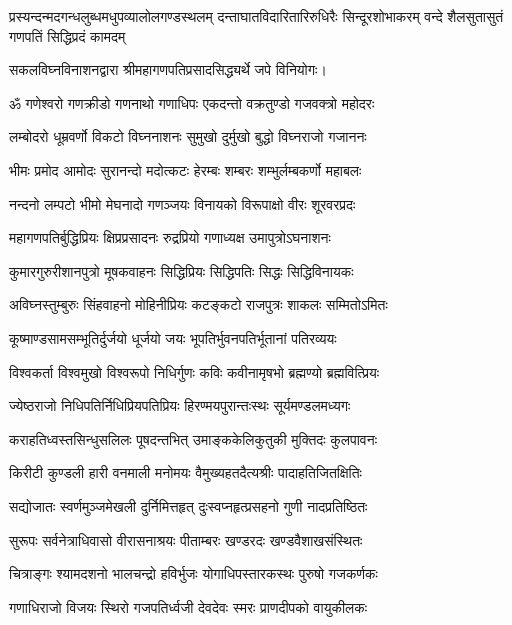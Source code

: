 {प्रस्यन्दन्मदगन्धलुब्धमधुपव्यालोलगण्डस्थलम्}
{दन्ताघातविदारितारिरुधिरैः सिन्दूरशोभाकरम्}
{वन्दे शैलसुतासुतं गणपतिं सिद्धिप्रदं कामदम्}

सकलविघ्नविनाशनद्वारा श्रीमहागणपतिप्रसादसिद्ध्यर्थे जपे विनियोगः।



\resetShloka
\twolineshloka
{ॐ गणेश्वरो गणक्रीडो गणनाथो गणाधिपः}
{एकदन्तो वक्रतुण्डो गजवक्त्रो महोदरः}

\twolineshloka
{लम्बोदरो धूम्रवर्णो विकटो विघ्ननाशनः}
{सुमुखो दुर्मुखो बुद्धो विघ्नराजो गजाननः}

\twolineshloka
{भीमः प्रमोद आमोदः सुरानन्दो मदोत्कटः}
{हेरम्बः शम्बरः शम्भुर्लम्बकर्णो महाबलः}

\twolineshloka
{नन्दनो लम्पटो भीमो मेघनादो गणञ्जयः}
{विनायको विरूपाक्षो वीरः शूरवरप्रदः}

\twolineshloka
{महागणपतिर्बुद्धिप्रियः क्षिप्रप्रसादनः}
{रुद्रप्रियो गणाध्यक्ष उमापुत्रोऽघनाशनः}

\twolineshloka
{कुमारगुरुरीशानपुत्रो मूषकवाहनः}
{सिद्धिप्रियः सिद्धिपतिः सिद्धः सिद्धिविनायकः}

\twolineshloka
{अविघ्नस्तुम्बुरुः सिंहवाहनो मोहिनीप्रियः}
{कटङ्कटो राजपुत्रः शाकलः सम्मितोऽमितः}

\twolineshloka
{कूष्माण्डसामसम्भूतिर्दुर्जयो धूर्जयो जयः}
{भूपतिर्भुवनपतिर्भूतानां पतिरव्ययः}

\twolineshloka
{विश्वकर्ता विश्वमुखो विश्वरूपो निधिर्गुणः}
{कविः कवीनामृषभो ब्रह्मण्यो ब्रह्मवित्प्रियः}

\twolineshloka
{ज्येष्ठराजो निधिपतिर्निधिप्रियपतिप्रियः}
{हिरण्मयपुरान्तःस्थः सूर्यमण्डलमध्यगः}

\twolineshloka
{कराहतिध्वस्तसिन्धुसलिलः पूषदन्तभित्}
{उमाङ्ककेलिकुतुकी मुक्तिदः कुलपावनः}

\twolineshloka
{किरीटी कुण्डली हारी वनमाली मनोमयः}
{वैमुख्यहतदैत्यश्रीः पादाहतिजितक्षितिः}

\twolineshloka
{सद्योजातः स्वर्णमुञ्जमेखली दुर्निमित्तहृत्}
{दुःस्वप्नहृत्प्रसहनो गुणी नादप्रतिष्ठितः}

\twolineshloka
{सुरूपः सर्वनेत्राधिवासो वीरासनाश्रयः}
{पीताम्बरः खण्डरदः खण्डवैशाखसंस्थितः}

\twolineshloka
{चित्राङ्गः श्यामदशनो भालचन्द्रो हविर्भुजः}
{योगाधिपस्तारकस्थः पुरुषो गजकर्णकः}

\twolineshloka
{गणाधिराजो विजयः स्थिरो गजपतिर्ध्वजी}
{देवदेवः स्मरः प्राणदीपको वायुकीलकः}

